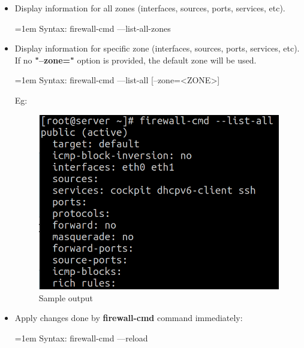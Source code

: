 \begin{flushleft}
\begin{itemize}
		\newpage

		\item Display information for all zones (interfaces, sources, ports, services, etc).
		\bigskip
		\begin{tcolorbox}[breakable,notitle,boxrule=1pt,colback=pink,colframe=pink]
			\color{black}
			\font=1em
			Syntax: firewall-cmd ---list-all-zones
			\font=4pt
		\end{tcolorbox}	

		\bigskip
		\bigskip		
		
		\item Display information for specific zone (interfaces, sources, ports, services, etc). If no \textbf{"--zone="} option is provided, the default zone will be used.
		\bigskip
		\begin{tcolorbox}[breakable,notitle,boxrule=1pt,colback=pink,colframe=pink]
			\color{black}
			\font=1em
			Syntax: firewall-cmd ---list-all [--zone=<ZONE>]
			\font=4pt
		\end{tcolorbox}	
		Eg:
		\begin{figure}[h!]
			\centering
			\includegraphics[scale=0.4]{content/chapter2/images/zones5.png}
			\caption{Sample output}
			\label{fig:zones4}
		\end{figure}

		\newpage
		\item Apply changes done by \textbf{firewall-cmd} command immediately:
		\begin{tcolorbox}[breakable,notitle,boxrule=1pt,colback=pink,colframe=pink]
			\color{black}
			\font=1em
			Syntax: firewall-cmd ---reload
			\font=4pt
		\end{tcolorbox}	
		

\end{itemize}
\end{flushleft}
